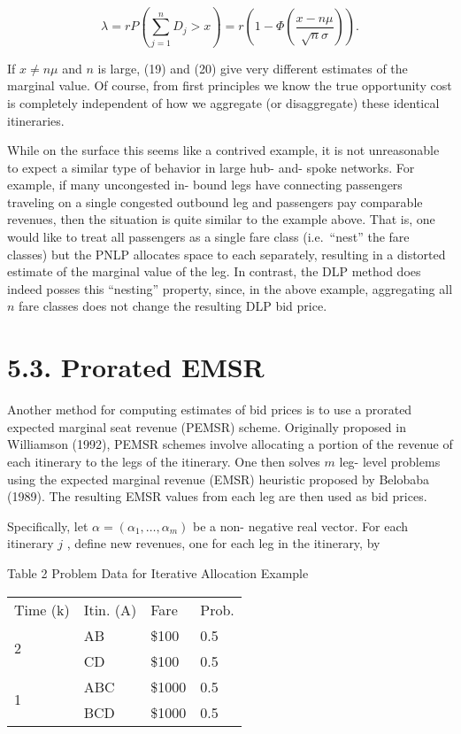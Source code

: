 \[
\lambda = r P\left(\sum_{j = 1}^{n}D_{j} > x\right) = r\left(1 - \Phi \left(\frac{x - n\mu}{\sqrt{n}\sigma}\right)\right). \tag{20}
\]

If \(x \neq n\mu\) and \(n\) is large, (19) and (20) give very different
estimates of the marginal value. Of course, from first principles we
know the true opportunity cost is completely independent of how we
aggregate (or disaggregate) these identical itineraries.

While on the surface this seems like a contrived example, it is not
unreasonable to expect a similar type of behavior in large hub- and-
spoke networks. For example, if many uncongested in- bound legs have
connecting passengers traveling on a single congested outbound leg and
passengers pay comparable revenues, then the situation is quite similar
to the example above. That is, one would like to treat all passengers as
a single fare class (i.e.~``nest'' the fare classes) but the PNLP
allocates space to each separately, resulting in a distorted estimate of
the marginal value of the leg. In contrast, the DLP method does indeed
posses this ``nesting'' property, since, in the above example,
aggregating all \(n\) fare classes does not change the resulting DLP bid
price.

\section{5.3. Prorated EMSR}\label{prorated-emsr}

Another method for computing estimates of bid prices is to use a
prorated expected marginal seat revenue (PEMSR) scheme. Originally
proposed in Williamson (1992), PEMSR schemes involve allocating a
portion of the revenue of each itinerary to the legs of the itinerary.
One then solves \(m\) leg- level problems using the expected marginal
revenue (EMSR) heuristic proposed by Belobaba (1989). The resulting EMSR
values from each leg are then used as bid prices.

Specifically, let \(\alpha = (\alpha_{1}, \ldots , \alpha_{m})\) be a
non- negative real vector. For each itinerary \(j\) , define new
revenues, one for each leg in the itinerary, by

Table 2 Problem Data for Iterative Allocation Example

\begin{longtable}[]{@{}llll@{}}
\toprule\noalign{}
\endhead
\bottomrule\noalign{}
\endlastfoot
Time (k) & Itin. (A) & Fare & Prob. \\
\multirow{2}{*}{2} & AB & \$100 & 0.5 \\
& CD & \$100 & 0.5 \\
\multirow{2}{*}{1} & ABC & \$1000 & 0.5 \\
& BCD & \$1000 & 0.5 \\
\end{longtable}


